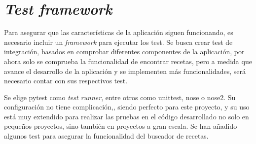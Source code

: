 \section{\emph{Test framework}}
Para asegurar que las características de la aplicación siguen funcionando, es necesario incluir un \emph{framework} para ejecutar los test. Se busca crear test de integración, basados en comprobar diferentes componentes de la aplicación, por ahora solo se comprueba la funcionalidad de encontrar recetas, pero a medida que avance el desarrollo de la aplicación y se implementen más funcionalidades, será necesario contar con sus respectivos test.

Se elige pytest como \emph{test runner}, entre otros como unittest, nose o nose2. Su configuración no tiene complicación,, siendo perfecto para este proyecto, y su uso está muy extendido para realizar las pruebas en el código desarrollado no solo en pequeños proyectos, sino también en proyectos a gran escala. Se han añadido algunos test para asegurar la funcionalidad del buscador de recetas. 


